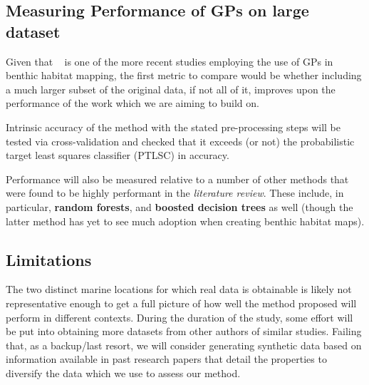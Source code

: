 \documentclass[12pt]{article}
\begin{document}
\subsection{Measuring Performance of GPs on large dataset}
Given that ~\citep{bender12} is one of the more recent studies employing the use of GPs in benthic habitat mapping, the first metric to compare would be whether including a much larger subset of the original data, if not all of it, improves upon the performance of the work which we are aiming to build on.

Intrinsic accuracy of the method with the stated pre-processing steps will be tested via cross-validation and checked that it exceeds (or not) the probabilistic target least squares classifier (PTLSC) in accuracy.

Performance will also be measured relative to a number of other methods that were found to be highly performant in the \textit{literature review}. These include, in particular, \textbf{random forests}, and \textbf{boosted decision trees} as well (though the latter method has yet to see much adoption when creating benthic habitat maps).

\subsection{Limitations}
The two distinct marine locations for which real data is obtainable is likely not representative enough to get a full picture of how well the method proposed will perform in different contexts. During the duration of the study, some effort will be put into obtaining more datasets from other authors of similar studies. Failing that, as a backup/last resort, we will consider generating synthetic data based on information available in past research papers that detail the properties to diversify the data which we use to assess our method.



\end{document}
